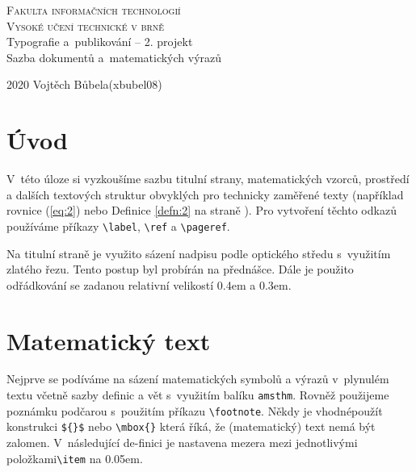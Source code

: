 \documentclass[11pt, twocolumn]{article}
\theoremstyle{definition}
\begin{document}
\begin{titlepage}
\begin{center}
\Huge
\textsc
{Fakulta informačních technologií\\ Vysoké učení technické v brně} \\[0.4em]
\LARGE
Typografie a~publikování -- 2. projekt\\[0.3em]
Sazba dokumentů a~matematických výrazů
\end{center}

\Large2020 \hfill Vojtěch Bůbela(xbubel08)
\end{titlepage}


\section*{Úvod} 

V~této úloze si vyzkoušíme sazbu titulní strany, matematických vzorců, prostředí a dalších textových struktur obvyklých pro technicky zaměřené texty (například rovnice (\ref{eq:2}) nebo Definice \ref{defn:2} na straně \pageref{defn:2}). Pro vytvoření těchto odkazů používáme příkazy \verb!\label!, \verb!\ref! a \verb!\pageref!.

Na titulní straně je využito sázení nadpisu podle optického středu s~využitím zlatého řezu. Tento postup byl probírán na přednášce. Dále je použito odřádkování se zadanou relativní velikostí 0.4em a 0.3em.

\section{Matematický text} 

Nejprve se podíváme na sázení matematických symbolů a výrazů v~plynulém textu včetně sazby definic a vět s~využitím balíku \verb!amsthm!. Rovněž použijeme poznámku podčarou s~použitím příkazu \verb!\footnote!. Někdy je vhodnépoužít konstrukci \verb!${}$! nebo \verb!\mbox{}! která říká, že (matematický) text nemá být zalomen. V~následující de-finici je nastavena mezera mezi jednotlivými položkami\verb!\item! na 0.05em.
\end{document}
